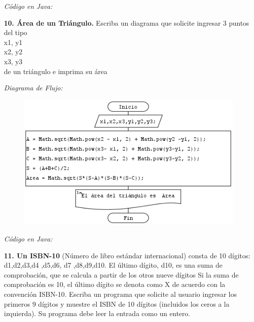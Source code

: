 \documentclass[12pt]{article}
\begin{document}
\textit{Código en Java:}

\newpage


\textbf{10. Área de un Triángulo. } Escriba un diagrama que solicite ingresar 3 puntos del tipo\\
  x1, y1 \\
  x2, y2 \\
  x3, y3\\
 de un triángulo e imprima su área
 
\textit{Diagrama de Flujo:  }
\begin{figure}[h!]
\centering
	\includegraphics[scale=1]{dicor/AreaDeUnTriangulo.png}    
\end{figure}

\textit{Código en Java:}

\newpage


\textbf{11. Un ISBN-10} (Número de libro estándar internacional) consta
de 10 dígitos: d1,d2,d3,d4 ,d5,d6, d7 ,d8,d9,d10. El último dígito, d10, es una suma de comprobación, que se calcula a partir de los otros nueve dígitos
Si la suma de comprobación es 10, el último dígito se denota como X de acuerdo con la
convención ISBN-10. Escriba un programa que solicite al usuario ingresar los primeros 9
dígitos y muestre el ISBN de 10 dígitos (incluidos los ceros a la izquierda). Su programa
debe leer la entrada como un entero.
\end{document}
